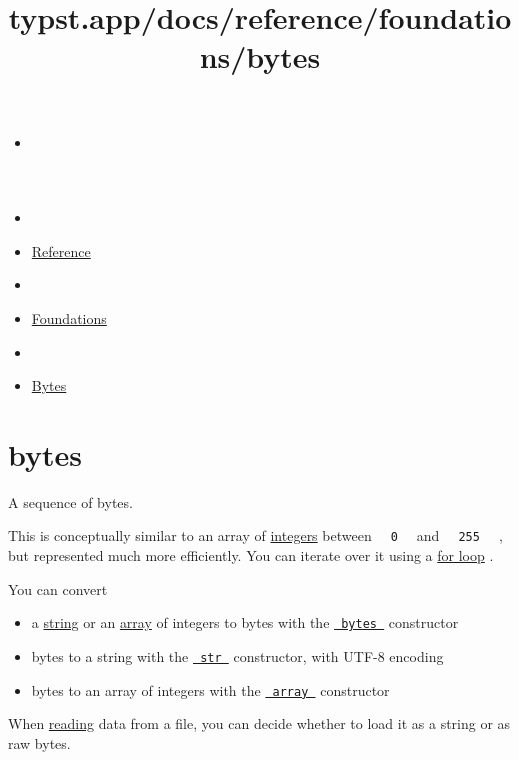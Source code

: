 \title{typst.app/docs/reference/foundations/bytes}

\begin{itemize}
\tightlist
\item
  \href{/docs}{}
\item
  
\item
  \href{/docs/reference/}{Reference}
\item
  
\item
  \href{/docs/reference/foundations/}{Foundations}
\item
  
\item
  \href{/docs/reference/foundations/bytes/}{Bytes}
\end{itemize}

\section{\texorpdfstring{{ bytes }}{ bytes }}\label{summary}

A sequence of bytes.

This is conceptually similar to an array of
\href{/docs/reference/foundations/int/}{integers} between
\texttt{\ }{\texttt{\ 0\ }}\texttt{\ } and
\texttt{\ }{\texttt{\ 255\ }}\texttt{\ } , but represented much more
efficiently. You can iterate over it using a
\href{/docs/reference/scripting/\#loops}{for loop} .

You can convert

\begin{itemize}
\tightlist
\item
  a \href{/docs/reference/foundations/str/}{string} or an
  \href{/docs/reference/foundations/array/}{array} of integers to bytes
  with the \href{/docs/reference/foundations/bytes/}{\texttt{\ bytes\ }}
  constructor
\item
  bytes to a string with the
  \href{/docs/reference/foundations/str/}{\texttt{\ str\ }} constructor,
  with UTF-8 encoding
\item
  bytes to an array of integers with the
  \href{/docs/reference/foundations/array/}{\texttt{\ array\ }}
  constructor
\end{itemize}

When \href{/docs/reference/data-loading/read/}{reading} data from a
file, you can decide whether to load it as a string or as raw bytes.

